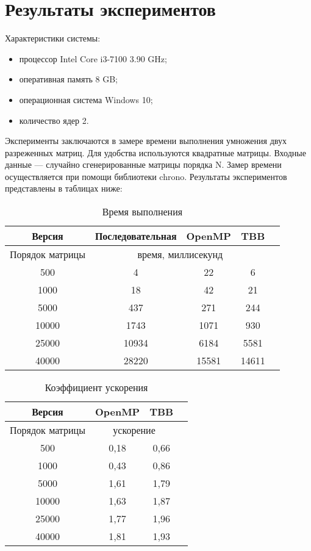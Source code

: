 \documentclass{report}
\begin{document}
\section*{Результаты экспериментов}
\par Характеристики системы:
\begin{itemize}
	\item процессор Intel Core i3-7100 3.90 GHz;
	\item оперативная память 8 GB;
	\item операционная система Windows 10;
	\item количество ядер 2.
\end{itemize}
\par Эксперименты заключаются в замере времени выполнения умножения двух разреженных матриц. Для удобства используются квадратные матрицы. Входные данные — случайно сгенерированные матрицы порядка N. Замер времени осуществляется при помощи библиотеки chrono. Результаты экспериментов представлены в таблицах ниже:
\begin{table}[htbp]
	\centering
	\begin{tabular}{|c|c|c|c|c|} \hline 
		Версия & Последовательная & OpenMP & TBB\\ \hline 
		Порядок матрицы & \multicolumn{3}{|c|}{время, миллисекунд} \\ \hline 
		500 & 4 & 22 & 6 \\ \hline 
		1000 & 18 & 42 & 21 \\ \hline 
		5000 & 437 & 271 & 244 \\ \hline 
		10000 & 1743 & 1071 & 930 \\ \hline 
		25000 & 10934 & 6184 & 5581 \\ \hline 
		40000 & 28220 & 15581 & 14611 \\ \hline 
	\end{tabular}
	\caption{Время выполнения}
\end{table}

\begin{table}[htbp]
	\centering
	\begin{tabular}{|c|c|c|c|} \hline 
		Версия & OpenMP & TBB \\ \hline 
		Порядок матрицы & \multicolumn{2}{|c|}{ускорение} \\ \hline 
		500 & 0,18 & 0,66 \\ \hline 
		1000 & 0,43 & 0,86 \\ \hline 
		5000 & 1,61 & 1,79 \\ \hline 
		10000 & 1,63 & 1,87 \\ \hline 
		25000 & 1,77 & 1,96 \\ \hline 
		40000 & 1,81 & 1,93 \\ \hline 
	\end{tabular}
	\caption{Коэффициент ускорения}
\end{table}
\newpage
\end{document}
